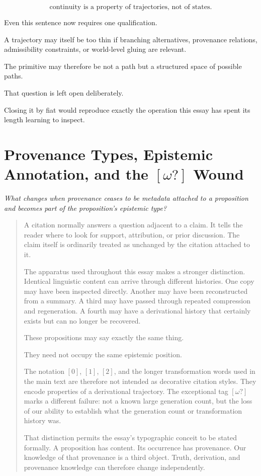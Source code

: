 \documentclass[
  11pt,
  a4paper,
  DIV=12,
  BCOR=0mm,
  parskip=half-
]{scrartcl}
\theoremstyle{definition}
\theoremstyle{plain}
\theoremstyle{remark}
\newcommand{\movementquestion}[1]{%
  \begin{center}
    \small\itshape
    #1
  \end{center}
  \medskip
}
\newenvironment{orientation}
  {%
    \begin{quote}
    \small
    \setlength{\parindent}{1em}
  }
  {%
    \end{quote}
  }
\begin{document}
\[
  \boxed{
    \text{continuity is a property of trajectories, not of states}
  }.
\]

Even this sentence now requires one qualification.

A trajectory may itself be too thin if branching alternatives, provenance
relations, admissibility constraints, or world-level gluing are relevant.

The primitive may therefore be not a path but a structured space of possible
paths.

That question is left open deliberately.

Closing it by fiat would reproduce exactly the operation this essay has spent
its length learning to inspect.


\section{Provenance Types, Epistemic Annotation, and the \texorpdfstring{$[\omega?]$}{[omega?]} Wound}
\label{app:provenance-types}

\movementquestion{What changes when provenance ceases to be metadata attached to a proposition and becomes part of the proposition's epistemic type?}

\begin{orientation}
A citation normally answers a question adjacent to a claim. It tells the reader
where to look for support, attribution, or prior discussion. The claim itself
is ordinarily treated as unchanged by the citation attached to it.

The apparatus used throughout this essay makes a stronger distinction.
Identical linguistic content can arrive through different histories. One copy
may have been inspected directly. Another may have been reconstructed from a
summary. A third may have passed through repeated compression and regeneration.
A fourth may have a derivational history that certainly exists but can no
longer be recovered.

These propositions may say exactly the same thing.

They need not occupy the same epistemic position.

The notation \( [0] \), \( [1] \), \( [2] \), and the longer transformation
words used in the main text are therefore not intended as decorative citation
styles. They encode properties of a derivational trajectory. The exceptional
tag \( [\omega?] \) marks a different failure: not a known large generation
count, but the loss of our ability to establish what the generation count or
transformation history was.

That distinction permits the essay's typographic conceit to be stated
formally. A proposition has content. Its occurrence has provenance. Our
knowledge of that provenance is a third object. Truth, derivation, and
provenance knowledge can therefore change independently.
\end{orientation}
\end{document}
